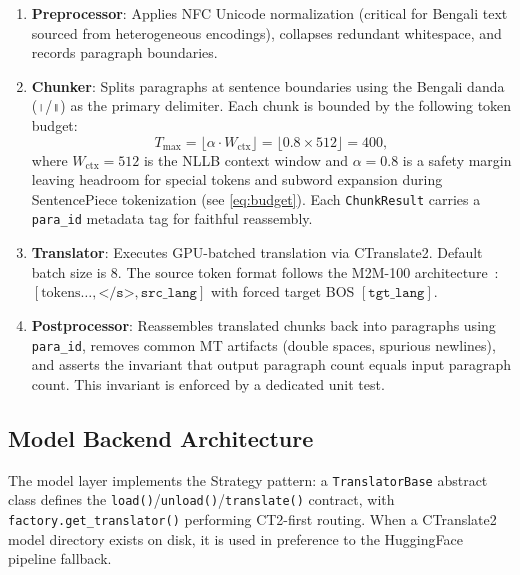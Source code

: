 \documentclass[conference]{IEEEtran}
\begin{document}
\begin{enumerate}
  \item \textbf{Preprocessor}: Applies NFC Unicode normalization (critical for Bengali
        text sourced from heterogeneous encodings), collapses redundant whitespace, and
        records paragraph boundaries.

  \item \textbf{Chunker}: Splits paragraphs at sentence boundaries using the Bengali
        danda (\texttt{।}/\texttt{॥}) as the primary delimiter. Each chunk is bounded
        by the following token budget:
        \begin{equation}
          T_{\max} = \lfloor \alpha \cdot W_{\mathrm{ctx}} \rfloor = \lfloor 0.8 \times 512 \rfloor = 400,
          \label{eq:budget}
        \end{equation}
        where $W_{\mathrm{ctx}} = 512$ is the NLLB context window and $\alpha = 0.8$
        is a safety margin leaving headroom for special tokens and subword expansion
        during SentencePiece tokenization (see \eqref{eq:budget}).
        Each \texttt{ChunkResult} carries a \texttt{para\_id} metadata tag for
        faithful reassembly.

  \item \textbf{Translator}: Executes GPU-batched translation via CTranslate2.
        Default batch size is 8. The source token format follows the M2M-100
        architecture~\cite{fan2021beyond}:
        $[\text{tokens}\ldots, \texttt{</s>}, \texttt{src\_lang}]$
        with forced target BOS $[\texttt{tgt\_lang}]$.

  \item \textbf{Postprocessor}: Reassembles translated chunks back into paragraphs
        using \texttt{para\_id}, removes common MT artifacts (double spaces, spurious
        newlines), and asserts the invariant that output paragraph count equals input
        paragraph count. This invariant is enforced by a dedicated unit test.
\end{enumerate}

\subsection{Model Backend Architecture}

The model layer implements the Strategy pattern: a \texttt{TranslatorBase} abstract
class defines the \texttt{load()}/\texttt{unload()}/\texttt{translate()} contract,
with \texttt{factory.get\_translator()} performing CT2-first routing.
When a CTranslate2 model directory exists on disk, it is used in preference to the
HuggingFace pipeline fallback.
\end{document}
